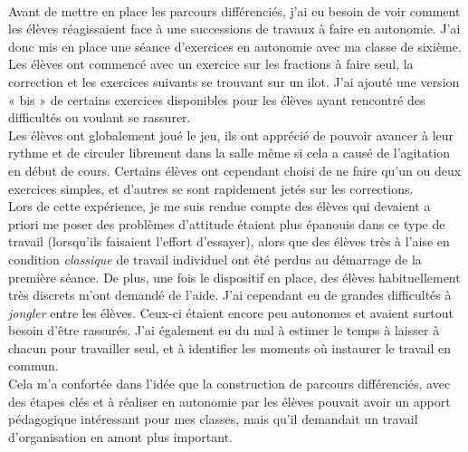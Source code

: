 \paragraph{}
Avant de mettre en place les parcours différenciés, j'ai eu besoin de voir comment les élèves réagissaient face à une successions de travaux à faire en autonomie. J'ai donc mis en place une séance d'exercices en autonomie avec ma classe de sixième. \\
Les élèves ont commencé avec un exercice sur les fractions à faire seul, la correction et les exercices suivants se trouvant sur un ilot. J'ai ajouté une version « bis » de certains exercices disponibles pour les élèves ayant rencontré des difficultés ou voulant se rassurer. \\
Les élèves ont globalement joué le jeu, ils ont apprécié de pouvoir avancer à leur  rythme et de circuler librement dans la salle même si cela a causé de l'agitation en début de cours. Certains élèves ont cependant choisi de ne faire qu'un ou deux exercices simples, et d'autres se sont rapidement jetés sur les corrections.\\
\newline
Lors de cette expérience, je me suis rendue compte des élèves qui devaient a priori me poser des problèmes d'attitude étaient plus épanouis dans ce type de travail (lorsqu'ils faisaient l'effort d'essayer), alors que des élèves très à l'aise en condition \emph{classique} de travail individuel ont été perdus au démarrage de la première séance. De plus, une fois le dispositif en place, des élèves habituellement très discrets m'ont demandé de l'aide. J'ai cependant eu de grandes difficultés à \emph{jongler} entre les élèves. Ceux-ci étaient encore peu autonomes et avaient surtout besoin d'être rassurés. J'ai également eu du mal à estimer le temps à laisser à chacun pour travailler seul, et à identifier les moments où instaurer le travail en commun.\\
Cela m'a confortée dans l'idée que la construction de parcours différenciés, avec des étapes clés et à réaliser en autonomie par les élèves pouvait avoir un apport pédagogique intéressant pour mes classes, mais qu'il demandait un travail d'organisation en amont plus important.


